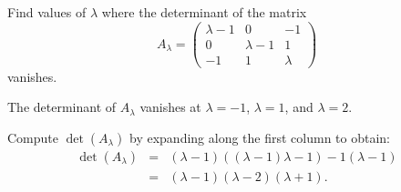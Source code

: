 \documentclass{ximera}
\begin{document}
\begin{exercise} \label{c10.1.c7}
Find values of $\lambda$ where the determinant of the matrix
\[
A_\lambda = \left( \begin{array}{ccr}
 \lambda -1 & 0 & -1\\
 0 & \lambda -1 & 1\\
-1 & 1 & \lambda 
\end{array} \right)
\]
vanishes.  

\begin{solution}

\ans The determinant of $A_\lambda$ vanishes at $\lambda = -1$,
$\lambda = 1$, and $\lambda = 2$.

\soln Compute $\det(A_\lambda)$ by expanding along the first column
to obtain:
\[
\begin{array}{rcl}
\det(A_\lambda) & = &
(\lambda - 1)((\lambda - 1)\lambda - 1) - 1(\lambda - 1) \\
& = & (\lambda - 1)(\lambda - 2)(\lambda + 1).
\end{array}
\]

\end{solution}
\end{exercise}
\end{document}
